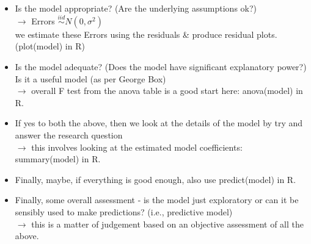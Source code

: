 \documentclass[a4paper, 11pt, twoside]{article}
\begin{document}
\begin{itemize}
	\item Is the model appropriate? (Are the underlying assumptions ok?)\\
	$\rightarrow$ Errors $\overset{iid}\sim N(0, \sigma^2)$\\
	we estimate these Errors using the residuals \& produce residual plots. (plot(model) in R)
	\item Is the model adequate? (Does the model have significant explanatory power?)\\
	Is it a useful model (as per George Box)\\
	$\rightarrow$ overall F test from the anova table is a good start here: anova(model) in R.
	\item If yes to both the above, then we look at the details of the model by try and answer the research question\\
	$\rightarrow$ this involves looking at the estimated model coefficients: summary(model) in R.
	\item Finally, maybe, if everything is good enough, also use predict(model) in R.
	\item Finally, some overall assessment - is the model just exploratory or can it be sensibly used to make predictions? (i.e., predictive model)\\
	$\rightarrow$ this is a matter of judgement based on an objective assessment of all the above.
\end{itemize}
\end{document}
